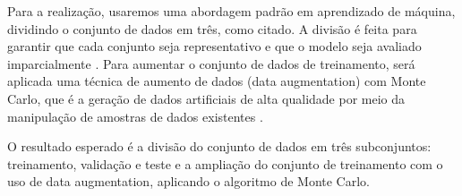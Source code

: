 Para a realização, usaremos uma abordagem padrão em aprendizado de máquina, dividindo o conjunto de dados em três, como citado. A divisão é feita para garantir que cada conjunto seja representativo e que o modelo seja avaliado imparcialmente \cite{bashir2020}. Para aumentar o conjunto de dados de treinamento, será aplicada uma técnica de aumento de dados (data augmentation) com Monte Carlo, que é a geração de dados artificiais de alta qualidade por meio da manipulação de amostras de dados existentes \cite{wang2019}. 

O resultado esperado é a divisão do conjunto de dados em três subconjuntos: treinamento, validação e teste e a ampliação do conjunto de treinamento com o uso de data augmentation, aplicando o algoritmo de Monte Carlo. 

\begin{table}[h!]
  \centering
  \renewcommand{\arraystretch}{1.0} 
  \captionsetup{font=footnotesize, justification=centering, labelsep=period, position=above}
  \caption{Fase 2: Desenvolvimento e Avaliação do Modelo}
  \label{tab:fase2}
\end{table}
